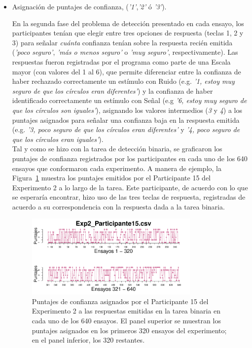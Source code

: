 \begin{itemize}

	\item Asignación de puntajes de confianza, (\textit{'1'},\textit{'2'} ó \textit{'3'}).

En la segunda fase del problema de detección presentado en cada ensayo, los participantes tenían que elegir entre tres opciones de respuesta (teclas 1, 2 y 3) para señalar \textit{cuánta} confianza tenían sobre la respuesta recién emitida (\textit{'poco seguro'}, \textit{'más o menos seguro'} o \textit{'muy seguro'}, respectivamente). Las respuestas fueron registradas por el programa como parte de una Escala mayor (con valores del 1 al 6), que permite diferenciar entre la confianza de haber rechazado correctamente un estímulo con Ruido (e.g. \textit{'1, estoy muy seguro de que los círculos eran diferentes'}) y la confianza de haber identificado correctamente un estímulo con Señal (e.g \textit{'6, estoy muy seguro de que los círculos son iguales'}), asignando los valores intermedios (\textit{3} y \textit{4}) a los puntajes asignados para señalar una confianza baja en la respuesta emitida (e.g. \textit{'3, poco seguro de que los círculos eran diferentes'} y \textit{'4, poco seguro de que los círculos eran iguales'}).\\

Tal y como se hizo con la tarea de detección binaria, se graficaron los puntajes de confianza registrados por los participantes en cada uno de los 640 ensayos que conformaron cada experimento. A manera de ejemplo, la Figura~\ref{fig:Rating_E2_P4} muestra los puntajes emitidos por el Participante 15 del Experimento 2 a lo largo de la tarea. Este participante, de acuerdo con lo que se esperaría encontrar, hizo uso de las tres teclas de respuesta, registradas de acuerdo a su correspondencia con la respuesta dada a la tarea binaria.\\ 
 
\begin{figure}[th]
\centering
\includegraphics[width=0.80\textwidth]{Figures/Rating_Exp2_P15} 
\caption[Asignación Puntaje de confianza: Ejemplo]{Puntajes de confianza asignados por el Participante 15 del Experimento 2 a las respuestas emitidas en la tarea binaria en cada uno de los 640 ensayos. El panel superior se muestran los puntajes asignados en los primeros 320 ensayos del experimento; en el panel inferior, los 320 restantes.}
\label{fig:Rating_E2_P4}
\end{figure}


\end{itemize}
